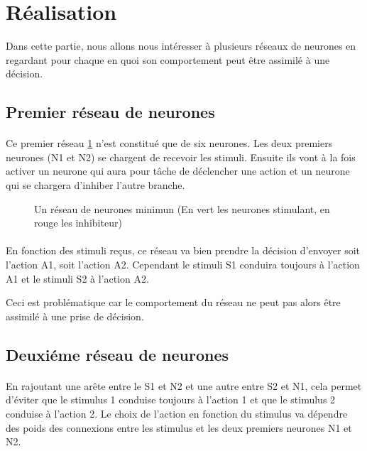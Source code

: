 \section{Réalisation}
Dans cette partie, nous allons nous intéresser à plusieurs réseaux de neurones
en regardant pour chaque en quoi son comportement peut être assimilé à une 
décision.


\subsection{Premier réseau de neurones}
\paragraph{}
Ce premier réseau \ref{reseau1} n'est constitué que de six neurones. Les deux
premiers neurones (N1 et N2) se chargent de recevoir les stimuli. Ensuite ils 
vont à la fois activer un neurone qui aura pour tâche de déclencher une 
action et un neurone qui se chargera d'inhiber l'autre branche. 

\begin{figure}[!h]
  \begin{center}
    
  \end{center}
  \caption{Un réseau de neurones minimun (En vert les neurones stimulant, en rouge les inhibiteur)}
  \label{reseau1}
\end{figure}

\paragraph{}
En fonction des stimuli reçus, ce réseau va bien prendre la décision 
d'envoyer soit l'action A1, soit l'action A2. Cependant le 
stimuli S1 conduira toujours à l'action A1 et le stimuli S2 à 
l'action A2.

Ceci est problématique car le comportement du réseau ne peut pas 
alors être assimilé à une prise de décision.

\subsection{Deuxiéme réseau de neurones}
\paragraph{}
En rajoutant une arête entre le S1 et N2 et une autre entre S2 et N1, cela
permet d'éviter que le stimulus 1 conduise toujours à l'action 1 et que le
stimulus 2 conduise à l'action 2. Le choix de l'action en fonction du stimulus
va dépendre des poids des connexions entre les stimulus et les deux premiers
neurones N1 et N2.

